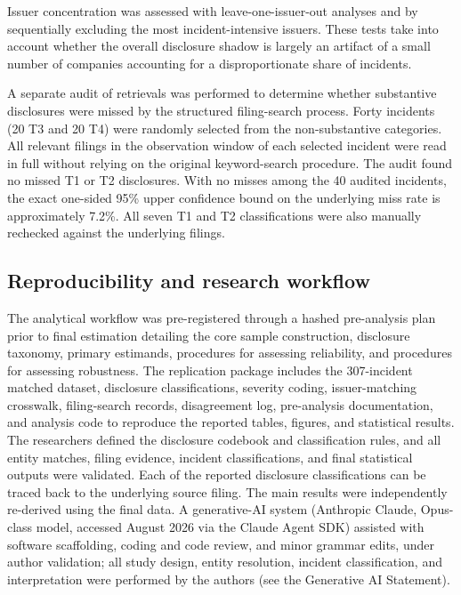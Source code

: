 \documentclass[utf8]{FrontiersinHarvard}
\begin{document}
Issuer concentration was assessed with leave-one-issuer-out analyses and by sequentially excluding the most incident-intensive issuers. These tests take into account whether the overall disclosure shadow is largely an artifact of a small number of companies accounting for a disproportionate share of incidents.

A separate audit of retrievals was performed to determine whether substantive disclosures were missed by the structured filing-search process. Forty incidents (20 T3 and 20 T4) were randomly selected from the non-substantive categories. All relevant filings in the observation window of each selected incident were read in full without relying on the original keyword-search procedure. The audit found no missed T1 or T2 disclosures. With no misses among the 40 audited incidents, the exact one-sided 95\% upper confidence bound on the underlying miss rate is approximately 7.2\%. All seven T1 and T2 classifications were also manually rechecked against the underlying filings.

\subsection{Reproducibility and research workflow}
The analytical workflow was pre-registered through a hashed pre-analysis plan prior to final estimation detailing the core sample construction, disclosure taxonomy, primary estimands, procedures for assessing reliability, and procedures for assessing robustness. The replication package includes the 307-incident matched dataset, disclosure classifications, severity coding, issuer-matching crosswalk, filing-search records, disagreement log, pre-analysis documentation, and analysis code to reproduce the reported tables, figures, and statistical results. The researchers defined the disclosure codebook and classification rules, and all entity matches, filing evidence, incident classifications, and final statistical outputs were validated. Each of the reported disclosure classifications can be traced back to the underlying source filing. The main results were independently re-derived using the final data. A generative-AI system (Anthropic Claude, Opus-class model, accessed August 2026 via the Claude Agent SDK) assisted with software scaffolding, coding and code review, and minor grammar edits, under author validation; all study design, entity resolution, incident classification, and interpretation were performed by the authors (see the Generative AI Statement).
\end{document}
